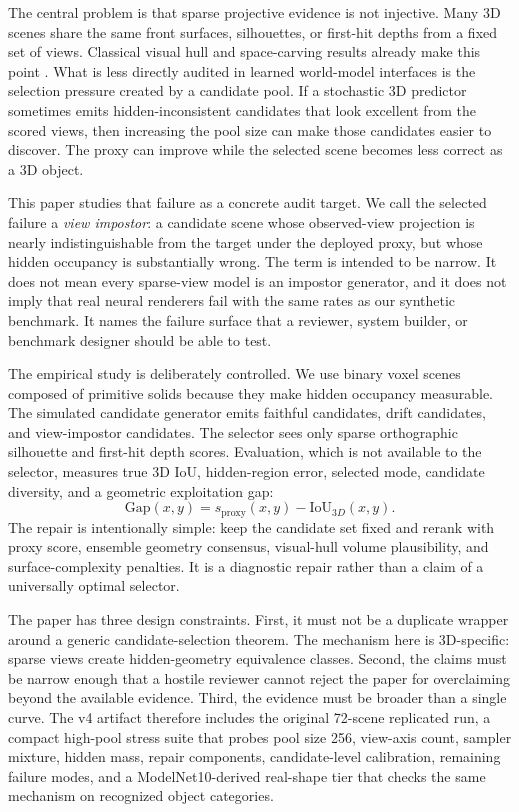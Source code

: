 \documentclass{article}
\newcommand{\gap}{\mathrm{Gap}}
\begin{document}
The central problem is that sparse projective evidence is not injective. Many
3D scenes share the same front surfaces, silhouettes, or first-hit depths from
a fixed set of views. Classical visual hull and space-carving results already
make this point \cite{laurentini1994visual,kutulakos2000space}. What is less
directly audited in learned world-model interfaces is the selection pressure
created by a candidate pool. If a stochastic 3D predictor sometimes emits
hidden-inconsistent candidates that look excellent from the scored views, then
increasing the pool size can make those candidates easier to discover. The
proxy can improve while the selected scene becomes less correct as a 3D object.

This paper studies that failure as a concrete audit target. We call the
selected failure a \emph{view impostor}: a candidate scene whose observed-view
projection is nearly indistinguishable from the target under the deployed
proxy, but whose hidden occupancy is substantially wrong. The term is intended
to be narrow. It does not mean every sparse-view model is an impostor generator,
and it does not imply that real neural renderers fail with the same rates as
our synthetic benchmark. It names the failure surface that a reviewer, system
builder, or benchmark designer should be able to test.

The empirical study is deliberately controlled. We use binary voxel scenes
composed of primitive solids because they make hidden occupancy measurable.
The simulated candidate generator emits faithful candidates, drift candidates,
and view-impostor candidates. The selector sees only sparse orthographic
silhouette and first-hit depth scores. Evaluation, which is not available to
the selector, measures true 3D IoU, hidden-region error, selected mode,
candidate diversity, and a geometric exploitation gap:
\[
\gap(x,y)=s_{\mathrm{proxy}}(x,y)-\mathrm{IoU}_{3D}(x,y).
\]
The repair is intentionally simple: keep the candidate set fixed and rerank
with proxy score, ensemble geometry consensus, visual-hull volume plausibility,
and surface-complexity penalties. It is a diagnostic repair rather than a
claim of a universally optimal selector.

The paper has three design constraints. First, it must not be a duplicate
wrapper around a generic candidate-selection theorem. The mechanism here is
3D-specific: sparse views create hidden-geometry equivalence classes. Second,
the claims must be narrow enough that a hostile reviewer cannot reject the
paper for overclaiming beyond the available evidence. Third, the evidence must
be broader than a single curve. The v4 artifact therefore includes the original
72-scene replicated run, a compact high-pool stress suite that probes pool size
256, view-axis count, sampler mixture, hidden mass, repair components,
candidate-level calibration, remaining failure modes, and a ModelNet10-derived
real-shape tier that checks the same mechanism on recognized object categories.
\end{document}
